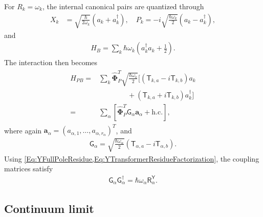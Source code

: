 \documentclass[prx,aps,twocolumn,article]{revtex4-2}
\newcommand{\msf}[1]{\mathsf{#1}}
\newcommand{\bsb}[1]{\boldsymbol{#1}}
\newcommand{\bPhi}{\bsb{\Phi}}
\newcommand{\ba}{\bsb{a}}
\newcommand{\msT}{\msf{T}}
\newcommand{\msY}{\msf{Y}}
\newcommand{\msG}{\msf{G}}
\newcommand{\msR}{\msf{R}}
\begin{document}
For $R_k=\omega_k$, the internal canonical pairs are quantized through
\begin{align}
    X_k
    &=
    \sqrt{
        \frac{\hbar}{2\omega_k}
    }
    \left(
        a_k+a_k^\dag
    \right),
    \quad
    P_k
    =
    -i
    \sqrt{
        \frac{\hbar\omega_k}{2}
    }
    \left(
        a_k-a_k^\dag
    \right),
\end{align}
and
\begin{align}
    H_B
    =
    \sum_k
    \hbar\omega_k
    \left(
        a_k^\dag a_k
        +
        \frac{1}{2}
    \right).
\end{align}
The interaction then becomes
\begin{align}
\begin{aligned}
    H_{PB}
    ={}&
    \sum_k
    \hat{\bPhi}_P^T
    \sqrt{
        \frac{\hbar\omega_k}{2}
    }
    \bigg[
        \left(
            \msT_{k,a}
            -
            i\msT_{k,b}
        \right)
        a_k
    \\
    &\qquad\qquad+
        \left(
            \msT_{k,a}
            +
            i\msT_{k,b}
        \right)
        a_k^\dag
    \bigg]
    \\
    ={}&
    \sum_\alpha
    \left[
        \hat{\bPhi}_P^T
        \msG_\alpha
        \ba_\alpha
        +
        \mathrm{h.c.}
    \right],
\end{aligned}
\end{align}
where again
$\ba_\alpha=
(a_{\alpha,1},\ldots,a_{\alpha,r_\alpha})^T$, and
\begin{align}
    \msG_\alpha
    =
    \sqrt{
        \frac{\hbar\omega_\alpha}{2}
    }
    \left(
        \msT_{\alpha,a}
        -
        i\msT_{\alpha,b}
    \right).
    \label{Eq:YNRCoupling}
\end{align}
Using \cref{Eq:YFullPoleResidue,Eq:YTransformerResidueFactorization}, the coupling matrices satisfy
\begin{align}
    \msG_\alpha
    \msG_\alpha^\dag
    =
    \hbar\omega_\alpha
    \msR_\alpha^\msY.
    \label{Eq:YDiscreteCouplingResidue}
\end{align}


\subsection{Continuum limit}
\end{document}
